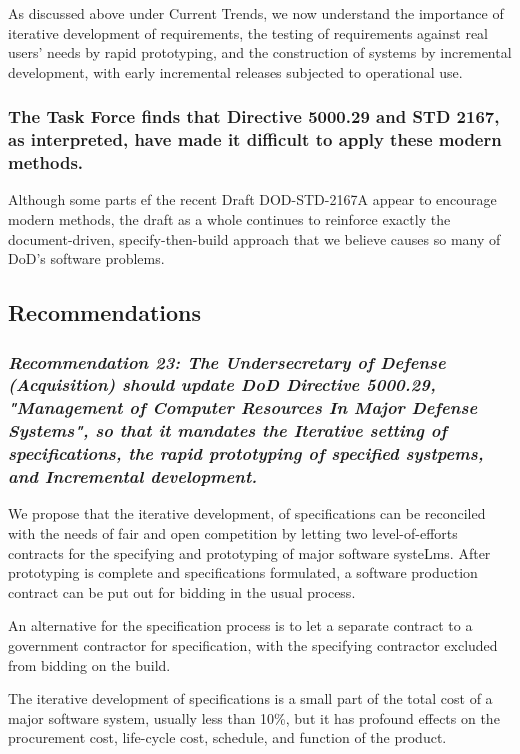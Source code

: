 \documentclass[12pt]{article}
\begin{document}
As discussed above under Current Trends, we now understand the importance of
iterative development of requirements, the testing of requirements against real
users’ needs by rapid prototyping, and the construction of systems by
incremental development, with early incremental releases subjected to
operational use.

\subsubsection*{The Task Force finds that Directive 5000.29 and STD 2167, as
interpreted, have made it difficult to apply these modern methods.}

Although some parts ef the recent Draft DOD-STD-2167A appear to encourage
modern methods, the draft as a whole continues to reinforce exactly the
document-driven, specify-then-build approach that we believe causes so many of
DoD’s software problems.

\subsection*{Recommendations}

\subsubsection*{\textit{Recommendation 23: The Undersecretary of Defense
(Acquisition) should update DoD Directive 5000.29, "Management of Computer
Resources In Major Defense Systems", so that it mandates the Iterative setting
of specifications, the rapid prototyping of specified systpems, and Incremental
development.}}

We propose that the iterative development, of specifications can be reconciled
with the needs of fair and open competition by letting two level-of-efforts
contracts for the specifying and prototyping of major software systeLms. After
prototyping is complete and specifications formulated, a software production
contract can be put out for bidding in the usual process.

An alternative for the specification process is to let a separate contract to a government
contractor for specification, with the specifying contractor excluded from bidding on the
build.

The iterative development of specifications is a small part of the total cost
of a major software system, usually less than 10\%, but it has profound effects
on the procurement cost, life-cycle cost, schedule, and function of the
product.
\end{document}
